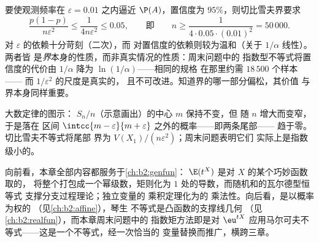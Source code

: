 \begin{example}[$n$ 至少要多大？]\label{ex:b2:randomvar:llnnumeric}
要使观测频率在 $\varepsilon = 0.01$ 之内逼近
$\P(A)$，置信度为 $95\%$，则切比雪夫界要求
\[
\frac{p(1-p)}{n\varepsilon^2} \leq \frac{1}{4n\varepsilon^2}
\leq 0.05,
\qquad\text{即}\qquad
n \geq \frac{1}{4\cdot0.05\cdot(0.01)^2} = 50\,000 .
\]
对 $\varepsilon$ 的依赖十分苛刻（二次），而
对置信度的依赖则较为温和（关于 $1/\alpha$ 线性）。两者皆
是\emph{界}本身的性质，而非真实情况的性质：周末问题中的
指数型不等式将置信度的代价由
$1/\alpha$ 降为 $\ln(1/\alpha)$——相同的规格
在那里约需 $18\,500$ 个样本——
而 $1/\varepsilon^2$ 的尺度是真实的，
且不可改进。知道界的哪一部分偏松，其价值
与界本身同样重要。
\end{example}

\begin{omfigure}

{\small 大数定律的图示：
$S_n/n$（示意画出）的中心 $m$ 保持不变，但
随 $n$ 增大而变窄，于是落在
区间 $\intcc{m-\varepsilon}{m+\varepsilon}$ 之外的概率——即两条尾部——
趋于零。切比雪夫不等式将尾部
界为 $V(X_1)/(n\varepsilon^2)$；周末问题表明它们
实际上是指数级小的。}
\end{omfigure}

\begin{remark}[本册中的视角]
向前看，本章全部内容都服务于\cref{ch:b2:genfun}：
$\E(t^X)$ 是对 $X$ 的某个巧妙函数取的，
将整个打包成一个幂级数，矩则化为
 $1$ 处的导数，而随机和的瓦尔德型恒等式
支撑分支过程理论；独立变量的
乘积定理化为的
乘法性。向后看，是以概率为权的
（见\cref{ch:b2:affine}），琴生
不等式是凸函数的支撑线几何
（见\cref{ch:b2:realfun}），而本章周末问题中的
指数矩方法即是对
 $\eu^{tX}$ 应用马尔可夫不等式——这是一个不等式，经一次恰当的
变量替换而推广，横跨三章。
\end{remark}

